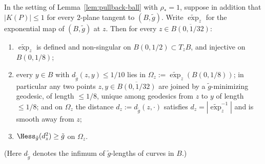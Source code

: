 \begin{lemma}
\label{lem:pullback-unique-minimizers}
In the setting of Lemma~\ref{lem:pullback-ball} with $\rho_*=1$,
suppose in addition that $|K(P)|\le1$ for every $2$-plane tangent
to $(B,\tilde g)$. Write $\widetilde\exp_z$ for the exponential
map of $(B,\tilde g)$ at $z$. Then for every $z\in
\overline{B(0,1/32)}$:
\begin{enumerate}
\item $\widetilde\exp_z$ is defined and non-singular on
$B(0,1/2)\subset T_z B$, and injective on $B(0,1/8)$;
\item every $y\in B$ with $d_{\tilde g}(z,y)\le1/10$ lies in
$\Omega_z:=\widetilde\exp_z(B(0,1/8))$; in particular any two
points $z,y\in\overline{B(0,1/32)}$ are joined by a
$\tilde g$-minimizing geodesic, of length $\le1/8$, unique among
geodesics from $z$ to $y$ of length $\le 1/8$; and on
$\Omega_z$ the distance
$d_z:=d_{\tilde g}(z,\cdot)$ satisfies
$d_z=|\widetilde\exp_z^{-1}|$ and is smooth away from $z$;
\item $\Hess_{\tilde g}(d_z^2)\ge\tilde g$ on $\Omega_z$.
\end{enumerate}
(Here $d_{\tilde g}$ denotes the infimum of $\tilde g$-lengths of
curves in $B$.)
\end{lemma}

